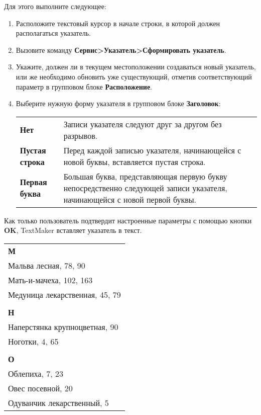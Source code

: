 ﻿\documentclass[a4paper,10pt]{article}
\begin{document}
Для этого выполните следующее:
\begin{enumerate}
 \item Расположите текстовый курсор в начале строки, в которой должен располагаться указатель.
 \item Вызовите команду \textbf{Сервис>Указатель>Сформировать указатель}.
 \item Укажите, должен ли в текущем местоположении создаваться новый указатель, или же необходимо обновить уже существующий, отметив соответствующий параметр в групповом блоке \textbf{Расположение}.
 \item Выберите нужную форму указателя в групповом блоке \textbf{Заголовок}:
 \begin{center}
\begin{tabular}{  m{4cm}  m{12cm}  }  
 \textbf{Нет} & Записи указателя следуют друг за другом без разрывов.\\ 
 \textbf{Пустая строка} & Перед каждой записью указателя, начинающейся с новой буквы, вставляется пустая строка.\\
  \textbf{Первая буква} & Большая буква, представляющая первую букву непосредственно следующей записи указателя, начинающейся с новой первой буквы.\\ 
\end{tabular} 
\end{center}
\end{enumerate}

Как только пользователь подтвердит настроенные параметры с помощью кнопки \textbf{OK}, TextMaker вставляет указатель в текст.

\begin{center}
\begin{tabular}{ | m{16cm} | }  
\hline
 \textbf{М} \\ 
  Мальва лесная, 78, 90 \\
  Мать-и-мачеха, 102, 163\\ 
Медуница лекарственная, 45, 79 \\
 \\
\textbf{Н} \\
Наперстянка крупноцветная, 90\\
Ноготки, 4, 65\\
\\
\textbf{О}\\
Облепиха, 7, 23\\
Овес посевной, 20\\
Одуванчик лекарственный, 5\\
\hline
\end{tabular} 
\end{center}
\end{document}
